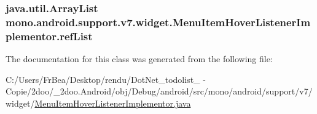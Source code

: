 \hypertarget{classmono_1_1android_1_1support_1_1v7_1_1widget_1_1_menu_item_hover_listener_implementor_2e32c04072bc4e744982df57b0aa84e7}{
\subsubsection[{refList}]{\setlength{\rightskip}{0pt plus 5cm}java.util.ArrayList {\bf mono.android.support.v7.widget.MenuItemHoverListenerImplementor.refList}}}
\label{classmono_1_1android_1_1support_1_1v7_1_1widget_1_1_menu_item_hover_listener_implementor_2e32c04072bc4e744982df57b0aa84e7}




The documentation for this class was generated from the following file:\begin{CompactItemize}
\item 
C:/Users/FrBea/Desktop/rendu/DotNet\_\-todolist\_ - Copie/2doo/\_\-2doo.Android/obj/Debug/android/src/mono/android/support/v7/widget/\hyperlink{_menu_item_hover_listener_implementor_8java}{MenuItemHoverListenerImplementor.java}\end{CompactItemize}
